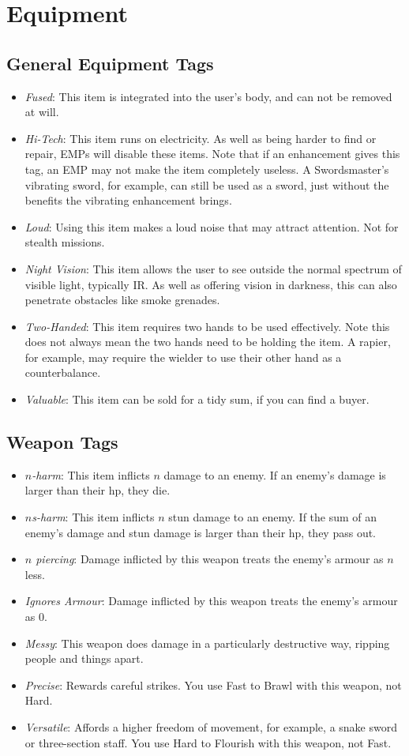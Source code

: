\section{Equipment}
\subsection{General Equipment Tags}
\begin{itemize}
\item \textit{Fused}: This item is integrated into the user's body, and can not be removed at will.
\item \textit{Hi-Tech}: This item runs on electricity. As well as being harder to find or repair, EMPs will disable these items. Note that if an enhancement gives this tag, an EMP may not make the item completely useless. A Swordsmaster's vibrating sword, for example, can still be used as a sword, just without the benefits the vibrating enhancement brings.
\item \textit{Loud}: Using this item makes a loud noise that may attract attention. Not for stealth missions.
\item \textit{Night Vision}: This item allows the user to see outside the normal spectrum of visible light, typically IR. As well as offering vision in darkness, this can also penetrate obstacles like smoke grenades. 
\item \textit{Two-Handed}: This item requires two hands to be used effectively. Note this does not always mean the two hands need to be holding the item. A rapier, for example, may require the wielder to use their other hand as a counterbalance. 
\item \textit{Valuable}: This item can be sold for a tidy sum, if you can find a buyer.
\end{itemize}

\subsection{Weapon Tags}
\begin{itemize}
\item \textit{$n$-harm}: This item inflicts $n$ damage to an enemy. If an enemy's damage is larger than their hp, they die.
\item \textit{$n$s-harm}: This item inflicts $n$ stun damage to an enemy. If the sum of an enemy's damage and stun damage is larger than their hp, they pass out.
\item \textit{$n$ piercing}: Damage inflicted by this weapon treats the enemy's armour as $n$ less. 
\item \textit{Ignores Armour}: Damage inflicted by this weapon treats the enemy's armour as 0. 
\item \textit{Messy}: This weapon does damage in a particularly destructive way, ripping people and things apart.
\item \textit{Precise}: Rewards careful strikes. You use Fast to Brawl with this weapon, not Hard.
\item \textit{Versatile}: Affords a higher freedom of movement, for example, a snake sword or three-section staff. You use Hard to Flourish with this weapon, not Fast.
\end{itemize}

